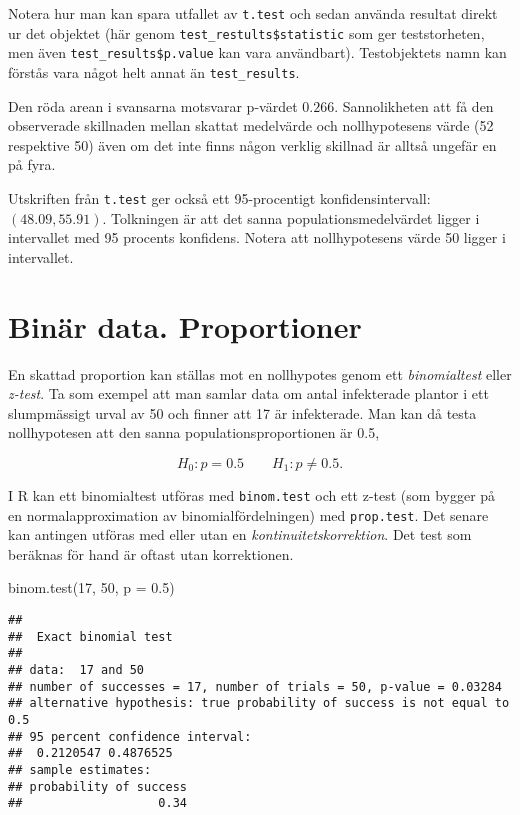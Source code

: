 \documentclass[
]{book}
\newenvironment{Shaded}{\begin{snugshade}}{\end{snugshade}}
\newcommand{\AttributeTok}[1]{\textcolor[rgb]{0.77,0.63,0.00}{#1}}
\newcommand{\DecValTok}[1]{\textcolor[rgb]{0.00,0.00,0.81}{#1}}
\newcommand{\FloatTok}[1]{\textcolor[rgb]{0.00,0.00,0.81}{#1}}
\newcommand{\FunctionTok}[1]{\textcolor[rgb]{0.00,0.00,0.00}{#1}}
\newcommand{\NormalTok}[1]{#1}
\theoremstyle{definition}
\theoremstyle{definition}
\theoremstyle{definition}
\theoremstyle{definition}
\theoremstyle{remark}
\begin{document}
Notera hur man kan spara utfallet av \texttt{t.test} och sedan använda resultat direkt ur det objektet (här genom \texttt{test\_restults\$statistic} som ger teststorheten, men även \texttt{test\_results\$p.value} kan vara användbart). Testobjektets namn kan förstås vara något helt annat än \texttt{test\_results}.

Den röda arean i svansarna motsvarar p-värdet \(0.266\). Sannolikheten att få den observerade skillnaden mellan skattat medelvärde och nollhypotesens värde (52 respektive 50) även om det inte finns någon verklig skillnad är alltså ungefär en på fyra.

Utskriften från \texttt{t.test} ger också ett 95-procentigt konfidensintervall: \((48.09, 55.91)\). Tolkningen är att det sanna populationsmedelvärdet ligger i intervallet med 95 procents konfidens. Notera att nollhypotesens värde 50 ligger i intervallet.

\hypertarget{binuxe4r-data.-proportioner}{%
\section{Binär data. Proportioner}\label{binuxe4r-data.-proportioner}}

En skattad proportion kan ställas mot en nollhypotes genom ett \emph{binomialtest} eller \emph{z-test}. Ta som exempel att man samlar data om antal infekterade plantor i ett slumpmässigt urval av 50 och finner att 17 är infekterade. Man kan då testa nollhypotesen att den sanna populationsproportionen är 0.5,

\[H_0: p = 0.5 \qquad H_1: p \neq 0.5.\]

I R kan ett binomialtest utföras med \texttt{binom.test} och ett z-test (som bygger på en normalapproximation av binomialfördelningen) med \texttt{prop.test}. Det senare kan antingen utföras med eller utan en \emph{kontinuitetskorrektion}. Det test som beräknas för hand är oftast utan korrektionen.

\begin{Shaded}
\begin{Highlighting}[]
\FunctionTok{binom.test}\NormalTok{(}\DecValTok{17}\NormalTok{, }\DecValTok{50}\NormalTok{, }\AttributeTok{p =} \FloatTok{0.5}\NormalTok{)}
\end{Highlighting}
\end{Shaded}

\begin{verbatim}
## 
##  Exact binomial test
## 
## data:  17 and 50
## number of successes = 17, number of trials = 50, p-value = 0.03284
## alternative hypothesis: true probability of success is not equal to 0.5
## 95 percent confidence interval:
##  0.2120547 0.4876525
## sample estimates:
## probability of success 
##                   0.34
\end{verbatim}
\end{document}
